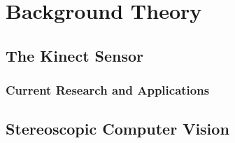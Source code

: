 \chapter{Background Theory}
\label{chp:theory} 

\section{The Kinect Sensor}

\subsection{Current Research and Applications}

\section{Stereoscopic Computer Vision}

